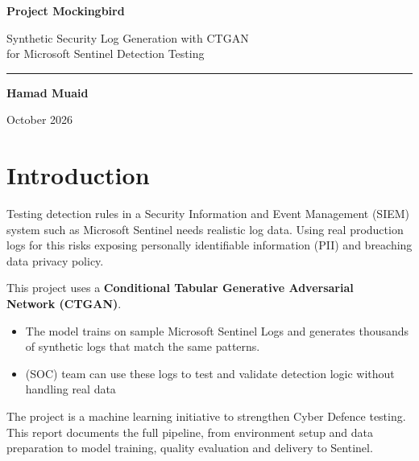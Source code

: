 \documentclass[11pt,a4paper]{article}
\begin{document}
\begin{titlepage}
\centering
\vspace*{4cm}
{\Huge\bfseries Project Mockingbird\par}
\vspace{0.8cm}
{\Large Synthetic Security Log Generation with CTGAN\\[0.3em]for Microsoft Sentinel Detection Testing\par}
\vspace{1.5cm}
\rule{0.5\textwidth}{0.4pt}\par
\vspace{1.5cm}
{\large\textbf{Hamad Muaid}\par}
\vspace{0.4cm}
{\large October 2026\par}
\vfill
\end{titlepage}

{\small\tableofcontents}
\newpage

\section{Introduction}\label{sec:intro}

Testing detection rules in a Security Information and Event Management (SIEM) system such as Microsoft Sentinel needs realistic log data. Using real production logs for this risks exposing personally identifiable information (PII) and breaching data privacy policy.\newline

This project uses a \textbf{Conditional Tabular Generative Adversarial \\ Network (CTGAN)}. 

\begin{itemize}
    \item The model trains on sample Microsoft Sentinel Logs and generates thousands of synthetic logs that match the same patterns.
    \item (SOC) team can use these logs to test and validate detection logic without handling real data
\end{itemize}

The project is a machine learning initiative to strengthen Cyber Defence testing. This report documents the full pipeline, from environment setup and data preparation to model training, quality evaluation and delivery to Sentinel.
\end{document}
